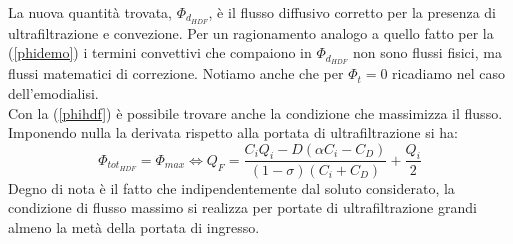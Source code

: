 La nuova quantità trovata, $\Phi_{d_{HDF}}$, è il flusso diffusivo corretto per la presenza di ultrafiltrazione e convezione. Per un ragionamento analogo a quello fatto per la (\ref{phidemo}) i termini convettivi che compaiono in $\Phi_{d_{HDF}}$ non sono flussi fisici, ma flussi matematici di correzione. Notiamo anche che per $\Phi_t=0$ ricadiamo nel caso dell'emodialisi.\\
\newline
Con la (\ref{phihdf}) è possibile trovare anche la condizione che massimizza il flusso. Imponendo nulla la derivata rispetto alla portata di ultrafiltrazione si ha:
\begin{equation*}
	\Phi_{tot_{HDF}}=\Phi_{max} \Leftrightarrow Q_F = \frac{C_iQ_i-D(\alpha C_i-C_D)}{(1-\sigma)(C_i+C_D)}+\frac{Q_i}{2}
\end{equation*}
Degno di nota è il fatto che indipendentemente dal soluto considerato, la condizione di flusso massimo si realizza per portate di ultrafiltrazione grandi almeno la metà della portata di ingresso.\\
